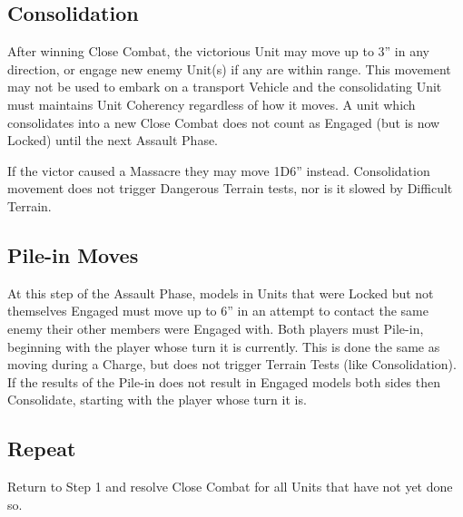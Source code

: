 \subsection{Consolidation}

After winning Close Combat, the victorious Unit may move up
to 3” in any direction, or engage new enemy Unit(s) if any are
within range. This movement may not be used to embark on a
transport Vehicle and the consolidating Unit must maintains
Unit Coherency regardless of how it moves. A unit which
consolidates into a new Close Combat does not count as
Engaged (but is now Locked) until the next Assault Phase.

If the victor caused a Massacre they may move 1D6” instead.
Consolidation movement does not trigger Dangerous Terrain
tests, nor is it slowed by Difficult Terrain.


\subsection{Pile-in Moves}
\label{Pile-in-Moves}
At this step of the Assault Phase, models in Units that were
Locked but not themselves Engaged must move up to 6” in an
attempt to contact the same enemy their other members were
Engaged with. Both players must Pile-in, beginning with the
player whose turn it is currently.
This is done the same as moving during a Charge, but does
not trigger Terrain Tests (like Consolidation). If the results of
the Pile-in does not result in Engaged models both sides then
Consolidate, starting with the player whose turn it is.

\subsection{Repeat}
Return to Step 1 and resolve Close Combat for all Units that
have not yet done so.

\stopcountsubsections

